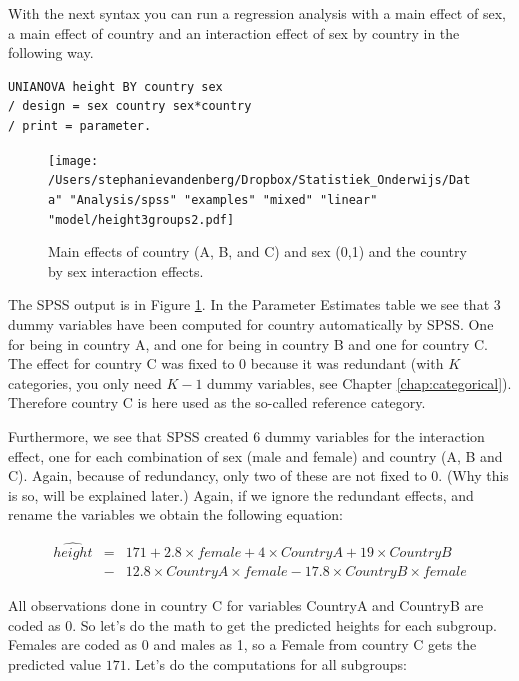 \documentclass[]{book}\usepackage[]{graphicx}\usepackage[]{color}
\begin{document}
With the next syntax you can run a regression analysis with a main effect of sex, a main effect of country and an interaction effect of sex by country in the following way.

\begin{verbatim}
UNIANOVA height BY country sex 
/ design = sex country sex*country
/ print = parameter.
\end{verbatim}


\begin{figure}[h]
    \begin{center}
       \texttt{[image: /Users/stephanievandenberg/Dropbox/Statistiek\_Onderwijs/Data" "Analysis/spss" "examples" "mixed" "linear" "model/height3groups2.pdf]}
    \end{center}
    \caption{Main effects of country (A, B, and C) and sex (0,1) and the country by sex interaction effects.}
     \label{fig:interactionheight3group}
\end{figure}

The SPSS output is in Figure \ref{fig:interactionheight3group}. In the Parameter Estimates table we see that 3 dummy variables have been computed for country automatically by SPSS. One for being in country A, and one for being in country B and one for country C. The effect for country C was fixed to 0 because it was redundant (with $K$ categories, you only need $K-1$ dummy variables, see Chapter \ref{chap:categorical}). Therefore country C is here used as the so-called reference category. 

Furthermore, we see that SPSS created 6 dummy variables for the interaction effect, one for each combination of sex (male and female) and country (A, B and C). Again, because of redundancy, only two of these are not fixed to 0. (Why this is so, will be explained later.) Again, if we ignore the redundant effects, and rename the variables we obtain the following equation:


\begin{eqnarray} 
\widehat{height} &=& 171 + 2.8  \times female + 4 \times CountryA +  19 \times CountryB \nonumber\\ 
&-& 12.8 \times CountryA \times female - 17.8 \times CountryB \times female  \nonumber
\end{eqnarray}


All observations done in country C for variables CountryA and CountryB are coded as 0. So let's do the math to get the predicted heights for each subgroup. Females are coded as 0 and males as 1, so a Female from country C gets the predicted value $171$. Let's do the computations for all subgroups:
\end{document}
